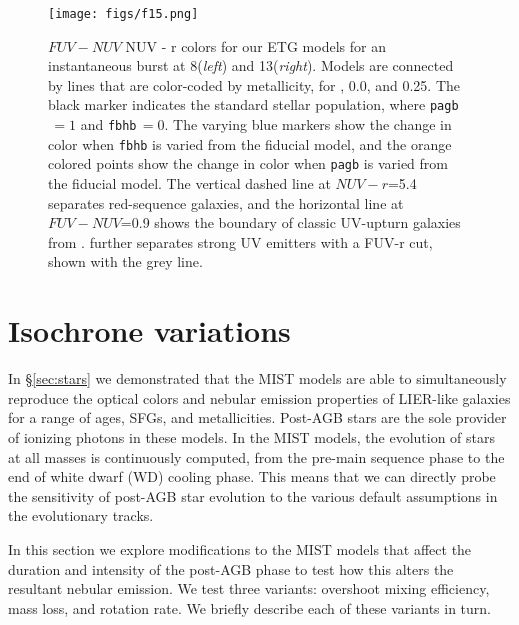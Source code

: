 \begin{figure}
  \begin{center}
    \texttt{[image: figs/f15.png]}
    \caption{$FUV-NUV$ \vs NUV - r colors for our ETG models for an instantaneous burst at 8\Gyr (\emph{left}) and 13\Gyr (\emph{right}). Models are connected by lines that are color-coded by metallicity, for , 0.0, and 0.25. The black marker indicates the standard stellar population, where {\tt pagb}$\,=1$ and {\tt fbhb}$\,=0$. The varying blue markers show the change in color when {\tt fbhb} is varied from the fiducial model, and the orange colored points show the change in color when {\tt pagb} is varied from the fiducial model.
    The vertical dashed line at $NUV-r$=5.4 separates red-sequence galaxies, and the horizontal line at $FUV-NUV$=0.9 shows the boundary of classic UV-upturn galaxies from \citet{Smith+2014}. \citet{Hernandez+2014} further separates strong UV emitters with a FUV-r cut, shown with the grey line.
    }
    \label{fig:UVhphb}
  \end{center}
\end{figure}

\section{Isochrone variations}

In \S\ref{sec:stars} we demonstrated that the MIST models are able to simultaneously reproduce the optical colors and nebular emission properties of LIER-like galaxies for a range of ages, SFGs, and metallicities. Post-AGB stars are the sole provider of ionizing photons in these models. In the MIST models, the evolution of stars at all masses is continuously computed, from the pre-main sequence phase to the end of white dwarf (WD) cooling phase. This means that we can directly probe the sensitivity of post-AGB star evolution to the various default assumptions in the evolutionary tracks.

In this section we explore modifications to the MIST models that affect the duration and intensity of the post-AGB phase to test how this alters the resultant nebular emission. We test three variants: overshoot mixing efficiency, mass loss, and rotation rate. We briefly describe each of these variants in turn.

